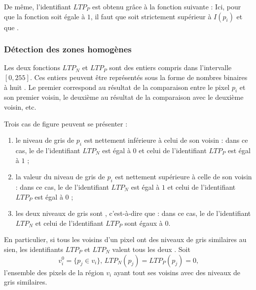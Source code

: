 De même, l'identifiant $LTP_{P}$ est obtenu  grâce à la fonction  suivante : 
Ici, pour  que la fonction  soit égale à $1$, il faut que  soit strictement supérieur à $I(p_{i})$ et que .

\subsubsection{Détection des zones homogènes}
Les deux fonctions $LTP_{N}$ et $LTP_{P}$ sont des entiers compris dans l'intervalle $[0,255]$. Ces entiers peuvent être représentés sous la forme de nombres binaires à huit . Le premier  correspond au résultat de la comparaison entre le pixel $p_{i}$ et son premier voisin, le deuxième au résultat de la comparaison avec le deuxième voisin, etc. 

Trois cas de figure peuvent se présenter :
\begin{enumerate}
\item le niveau de gris de $p_{i}$ est nettement inférieure à celui de son  voisin  : dans ce cas, le  de l'identifiant $LTP_{N}$ est égal à $0$ et celui de l'identifiant $LTP_{P}$ est égal à $1$ ;
\item la valeur du niveau de gris de $p_{i}$ est nettement supérieure à celle de son  voisin : dans ce cas, le  de l'identifiant $LTP_{N}$ est égal à $1$ et celui de l'identifiant $LTP_{P}$ est égal à $0$ ;
\item les deux niveaux de gris sont , c'est-à-dire que  : dans ce cas, le  de l'identifiant $LTP_{N}$  et celui de l'identifiant $LTP_{P}$ sont égaux à $0$.
\end{enumerate}

En particulier, si tous les voisins d'un pixel ont des niveaux de gris similaires au sien, les identifiants $LTP_{P}$ et $LTP_{N}$ valent tous les deux . Soit 
\begin{equation}
v_{i}^{0} = \lbrace p_{j} \in v_{i} \rbrace \text{, } LTP_{N}(p_{j})= LTP_{P}(p_{j})=0 \text{,}
\end{equation}
l'ensemble des pixels de la région $v_{i}$ ayant tout ses voisins avec des niveaux de gris similaires. 


